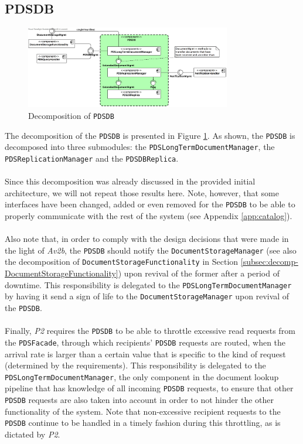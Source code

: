 \documentclass[a4paper,10pt]{article}
\begin{document}
\subsection{PDSDB}\label{subsec:decomp-PDSDB}
\begin{figure}[!htp]
	\centering
	\includegraphics[width=0.8\textwidth]{PDSDB.png}
	\caption{Decomposition of \texttt{PDSDB}}
	\label{fig:decomp-PDSDB}
\end{figure}
\FloatBarrier
\noindent
The decomposition of the \texttt{PDSDB} is presented in Figure \ref{fig:decomp-PDSDB}. As shown, the \texttt{PDSDB} is decomposed into three submodules: the \texttt{PDSLongTermDocumentManager}, the \texttt{PDSReplicationManager} and the \texttt{PDSDBReplica}.\\\\
Since this decomposition was already discussed in the provided initial architecture, we will not repeat those results here. Note, however, that some interfaces have been changed, added or even removed for the \texttt{PDSDB} to be able to properly communicate with the rest of the system (see Appendix \ref{app:catalog}).\\\\
Also note that, in order to comply with the design decisions that were made in the light of \textit{Av2b}, the \texttt{PDSDB} should notify the \texttt{DocumentStorageManager} (see also the decomposition of \texttt{DocumentStorageFunctionality} in Section \ref{subsec:decomp-DocumentStorageFunctionality}) upon revival of the former after a period of downtime. This responsibility is delegated to the \texttt{PDSLongTermDocumentManager} by having it send a sign of life to the \texttt{DocumentStorageManager} upon revival of the \texttt{PDSDB}.\\\\
Finally, \textit{P2} requires the \texttt{PDSDB} to be able to throttle excessive read requests from the \texttt{PDSFacade}, through which recipients' \texttt{PDSDB} requests are routed, when the arrival rate is larger than a certain value that is specific to the kind of request (determined by the requirements). This responsibility is delegated to the \texttt{PDSLongTermDocumentManager}, the only component in the document lookup pipeline that has knowledge of all incoming \texttt{PDSDB} requests, to ensure that other \texttt{PDSDB} requests are also taken into account in order to not hinder the other functionality of the system. Note that non-excessive recipient requests to the \texttt{PDSDB} continue to be handled in a timely fashion during this throttling, as is dictated by \textit{P2}.
\end{document}
